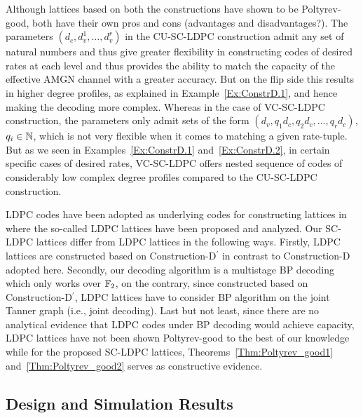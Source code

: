 \documentclass[journal,draftcls,onecolumn,12pt,twoside]{IEEEtran}
\begin{document}
\begin{Discussion}
Although lattices based on both the constructions have shown to be Poltyrev-good, both have their own pros and cons (advantages and disadvantages?). The parameters $(d_{c},d_{v}^{1},\ldots,d_{v}^{r})$ in the CU-SC-LDPC construction admit any set of natural numbers and thus give greater flexibility in constructing codes of desired rates at each level and thus provides the ability to match the capacity of the effective AMGN channel with a greater accuracy. But on the flip side this results in higher degree profiles, as explained in Example~\ref{Ex:ConstrD.1}, and hence making the decoding more complex.  Whereas in the case of VC-SC-LDPC construction, the parameters only admit sets of the form $(d_{v},q_{1}d_{c},q_{2}d_{c},\ldots,q_{r}d_{c})$, $q_{i}\in\mathbb{N}$, which is not very flexible when it comes to  matching a given rate-tuple. But as we seen in Examples~\ref{Ex:ConstrD.1} and~\ref{Ex:ConstrD.2}, in certain specific cases of desired rates, VC-SC-LDPC offers nested sequence of codes of considerably low complex degree profiles compared to the CU-SC-LDPC construction.
\end{Discussion}

\begin{Remark}
    LDPC codes have been adopted as underlying codes for constructing lattices in \cite{sadeghi06} where the so-called LDPC lattices have been proposed and analyzed. Our SC-LDPC lattices differ from LDPC lattices in the following ways. Firstly, LDPC lattices are constructed based on Construction-D$^{\prime}$ \cite{BarnesSloane83} in contrast to Construction-D adopted here. Secondly, our decoding algorithm is a multistage BP decoding which only works over $\mathbb{F}_2$, on the contrary, since constructed based on Construction-D$^{\prime}$, LDPC lattices have to consider BP algorithm on the joint Tanner graph \cite{Banihashemi01} (i.e., joint decoding). Last but not least, since there are no analytical evidence that LDPC codes under BP decoding would achieve capacity, LDPC lattices have not been shown Poltyrev-good to the best of our knowledge while for the proposed SC-LDPC lattices, Theorems~\ref{Thm:Poltyrev_good1} and~\ref{Thm:Poltyrev_good2} serves as constructive evidence.
\end{Remark}


\subsection{Design and Simulation Results}
\end{document}
